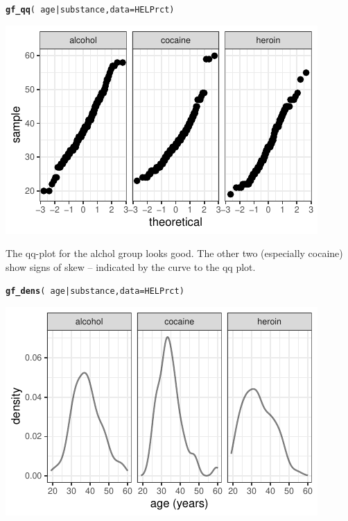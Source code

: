 \documentclass[twoside]{book}\usepackage[]{graphicx}\usepackage[]{xcolor}
\makeatletter
\def\maxwidth{ %
  \ifdim\Gin@nat@width>\linewidth
    \linewidth
  \else
    \Gin@nat@width
  \fi
}
\newcommand{\hlopt}[1]{\textcolor[rgb]{0,0,0}{#1}}%
\newcommand{\hlstd}[1]{\textcolor[rgb]{0.345,0.345,0.345}{#1}}%
\newcommand{\hlkwc}[1]{\textcolor[rgb]{0.333,0.667,0.333}{#1}}%
\newcommand{\hlkwd}[1]{\textcolor[rgb]{0.737,0.353,0.396}{\textbf{#1}}}%
\newenvironment{kframe}{%
 \def\at@end@of@kframe{}%
 \ifinner\ifhmode%
  \def\at@end@of@kframe{\end{minipage}}%
  \begin{minipage}{\columnwidth}%
 \fi\fi%
 \def\FrameCommand##1{\hskip\@totalleftmargin \hskip-\fboxsep
 \colorbox{shadecolor}{##1}\hskip-\fboxsep
     \hskip-\linewidth \hskip-\@totalleftmargin \hskip\columnwidth}%
 \MakeFramed {\advance\hsize-\width
   \@totalleftmargin\z@ \linewidth\hsize
   \@setminipage}}%
 {\par\unskip\endMakeFramed%
 \at@end@of@kframe}
\newenvironment{knitrout}{}{} %
\makeatother
\begin{document}
\begin{solution}
\begin{knitrout}
\color{fgcolor}\begin{kframe}
\begin{alltt}
\hlkwd{gf_qq}\hlstd{(} \hlopt{~} \hlstd{age} \hlopt{|} \hlstd{substance,} \hlkwc{data} \hlstd{= HELPrct)}
\end{alltt}
\end{kframe}

{\centering \includegraphics[width=\maxwidth]{figures/fig-unnamed-chunk-122-1} 

}



\end{knitrout}
The qq-plot for the alchol group looks good.  The other two (especially cocaine) show
signs of skew -- indicated by the curve to the qq plot.
\begin{knitrout}
\color{fgcolor}\begin{kframe}
\begin{alltt}
\hlkwd{gf_dens}\hlstd{(} \hlopt{~} \hlstd{age} \hlopt{|} \hlstd{substance,} \hlkwc{data} \hlstd{= HELPrct)}
\end{alltt}
\end{kframe}

{\centering \includegraphics[width=\maxwidth]{figures/fig-unnamed-chunk-123-1} 

}



\end{knitrout}
\end{solution}
\end{document}
